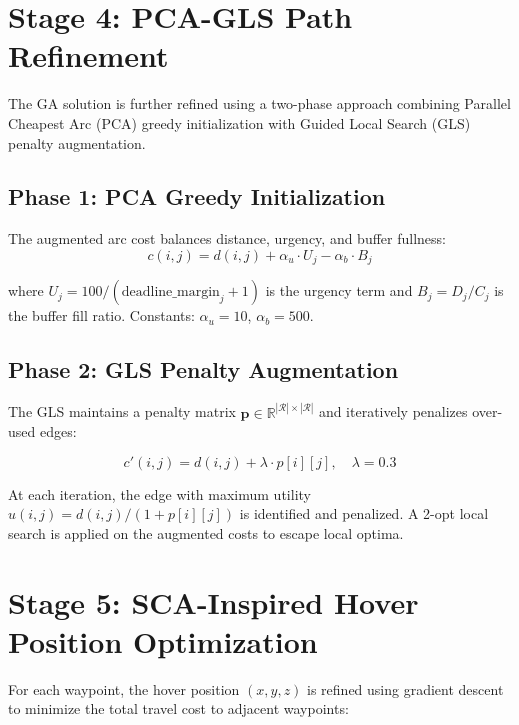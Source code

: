 \documentclass[12pt, a4paper, oneside]{report}
\newcommand{\vect}[1]{\mathbf{#1}}
\begin{document}
\section{Stage 4: PCA-GLS Path Refinement}
\label{sec:pca_gls}

The GA solution is further refined using a two-phase approach combining Parallel Cheapest Arc (PCA) greedy initialization with Guided Local Search (GLS) penalty augmentation.

\subsection{Phase 1: PCA Greedy Initialization}

The augmented arc cost balances distance, urgency, and buffer fullness:
\begin{equation}
c(i, j) = d(i, j) + \alpha_u \cdot U_j - \alpha_b \cdot B_j
\label{eq:pca_cost}
\end{equation}

where $U_j = 100 / (\text{deadline\_margin}_j + 1)$ is the urgency term and $B_j = D_j / C_j$ is the buffer fill ratio. Constants: $\alpha_u = 10$, $\alpha_b = 500$.

\subsection{Phase 2: GLS Penalty Augmentation}

The GLS maintains a penalty matrix $\vect{p} \in \mathbb{R}^{|\mathcal{R}| \times |\mathcal{R}|}$ and iteratively penalizes over-used edges:

\begin{equation}
c'(i, j) = d(i, j) + \lambda \cdot p[i][j], \quad \lambda = 0.3
\label{eq:gls_cost}
\end{equation}

At each iteration, the edge with maximum utility $u(i, j) = d(i, j) / (1 + p[i][j])$ is identified and penalized. A 2-opt local search is applied on the augmented costs to escape local optima.

\section{Stage 5: SCA-Inspired Hover Position Optimization}
\label{sec:sca}

For each waypoint, the hover position $(x, y, z)$ is refined using gradient descent to minimize the total travel cost to adjacent waypoints:
\end{document}
